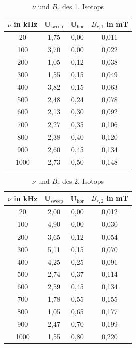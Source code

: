 \begin{minipage}{0.5\textwidth}
\begin{table}[H]
\begin{tabular}{c|cc|c}
$\nu$ in kHz & U$_{\text{sweep}}$ & U$_{\text{hor}}$ & $B_{r,1}$ in mT\\
\hline
 20 &	1,75&	0,00&	0,011\\
100&	3,70&	0,00&	0,022\\
200&	1,05&	0,12&	0,038\\
300&	1,55&	0,15&	0,049\\
400&	3,82&	0,15&	0,063\\
500&	2,48&	0,24&	0,078\\
600&	2,13&	0,30&	0,092\\
700&	2,27&	0,35&	0,106\\
800&	2,38&	0,40&	0,120\\
900&	2,60&	0,45&	0,134\\
1000&	2,73&	0,50&	0,148 \\
\end{tabular}
\caption{$\nu$ und $B_r$ des 1. Isotops}
\label{tab_nuB1}
\end{table}
\end{minipage}
\begin{minipage}{0,5\textwidth}
\begin{table}[H]
\begin{tabular}{c|cc|c}
$\nu$ in kHz & U$_{\text{sweep}}$ & U$_{\text{hor}}$ & $B_{r,2}$ in mT\\
\hline
20	&2,00&	0,00&	0,012\\
100&	4,90&	0,00&	0,030\\
200&	3,65&	0,12&	0,054\\
300&	5,11&	0,15&	0,070\\
400&	4,25&	0,25&	0,091\\
500&	2,74&	0,37&	0,114\\
600&	2,59&	0,45&	0,134\\
700&	1,78&	0,55&	0,155\\
800&	1,05&	0,65&	0,177\\
900&	2,47&	0,70&	0,199\\
1000&	1,55&	0,80&	0,220 \\
\end{tabular}
\caption{$\nu$ und $B_r$ des 2. Isotops}
\label{tab_nuB2}
\end{table}
\end{minipage}

